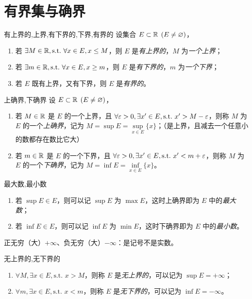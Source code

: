 \section{有界集与确界}

\begin{definition}{有上界的,上界,有下界的,下界,有界的}
	设集合 $E \subset \mathbb R \pod{E \ne \varnothing}$，
	\begin{enumerate}
		\item 若 $\exists M \in \mathbb R, \text{s.t.~} \forall x \in E, x \le M$，则 $E$ 是\emph{有上界的}，$M$ 为\emph{一个上界}；
		\item 若 $\exists m \in \mathbb R, \text{s.t.~} \forall x \in E, x \ge m$，则 $E$ 是\emph{有下界的}，$m$ 为\emph{一个下界}；
		\item 若 $E$ 既有上界，又有下界，则 $E$ 是\emph{有界的}。
	\end{enumerate}
\end{definition}

\begin{definition}{上确界,下确界}
	设 $E \subset \mathbb R \pod{E \ne \varnothing}$，
	\begin{enumerate}
		\item 若 $M \in \mathbb R$ 是 $E$ 的一个上界，且 $\forall \varepsilon > 0, \exists x' \in E, \text{s.t.~} x' > M - \varepsilon$，则称 $M$ 为 $E$ 的一个\emph{上确界}，记为 $M = \sup E = \sup\limits_{x \in E}\{x\}$；（是上界，且减去一个任意小的数都存在数比它大）
		\item 若 $m \in \mathbb R$ 是 $E$ 的一个下界，且 $\forall \varepsilon > 0, \exists x' \in E, \text{s.t.~} x' < m + \varepsilon$，则称 $M$ 为 $E$ 的一个\emph{下确界}，记为 $M = \inf E = \inf\limits_{x \in E}\{x\}$。
	\end{enumerate}
\end{definition}

\begin{definition}{最大数,最小数}
	\begin{enumerate}
		\item 若 $\sup E \in E$，则可以记 $\sup E$ 为 $\max E$，这时上确界即为 $E$ 中的\emph{最大数}；
		\item 若 $\inf E \in E$，则可以记 $\inf E$ 为 $\min E$，这时下确界即为 $E$ 中的\emph{最小数}。
	\end{enumerate}
\end{definition}

正无穷（大）$+\infty$、负无穷（大）$-\infty$：是记号不是实数。

\begin{definition}{无上界的,无下界的}
	\begin{enumerate}
		\item $\forall M, \exists x \in E, \text{s.t. } x > M$，则称 $E$ 是\emph{无上界的}，可以记为 $\sup E = +\infty$；
		\item $\forall m, \exists x \in E, \text{s.t. } x < m$，则称 $E$ 是\emph{无下界的}，可以记为 $\inf E = -\infty$。
	\end{enumerate}
\end{definition}


